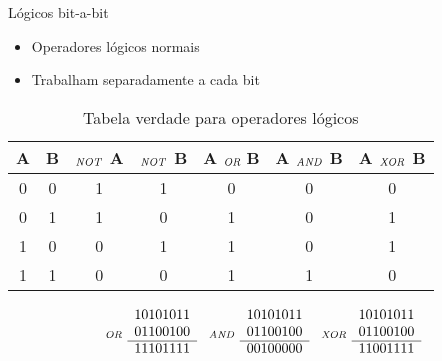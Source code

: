 \documentclass[11pt]{beamer}
\begin{document}
	\begin{frame}{Lógicos bit-a-bit}
		\only<1>
		{
			\begin{itemize}
				\presentationPause\item Operadores lógicos normais
				\presentationPause\item Trabalham separadamente a cada bit
			\end{itemize}
			\presentationPause
			\presentationPause\begin{table}[!h]
				\centering
				\caption{Tabela verdade para operadores lógicos}
				\label{table.truth}
				\begin{tabular}{c|c||c|c|c|c|c}
					A & B & $_\text{\emph{NOT}}$ A & $_\text{\emph{NOT}}$ B & A $_\text{\emph{OR} }$B & A $_\text{\emph{AND}}$ B & A $_\text{\emph{XOR}}$ B \\\hline
					0 & 0 & 1 & 1 & 0 & 0 & 0 \\
					0 & 1 & 1 & 0 & 1 & 0 & 1 \\
					1 & 0 & 0 & 1 & 1 & 0 & 1 \\
					1 & 1 & 0 & 0 & 1 & 1 & 0 \\
				\end{tabular}
			\end{table}
		}
		{
			\presentationPause
			\presentationPause\begin{equation}\nonumber
				\begin{array}{cc}
					&	10101011\\
					_\text{\emph{OR}}\!	&	01100100\\\cline{2-2}
					&	11101111
				\end{array}\  
				\begin{array}{cc}
					&	10101011\\
					_\text{\emph{AND}}\!	&	01100100\\\cline{2-2}
					&	00100000
				\end{array}\
				\begin{array}{cc}
					&	10101011\\
					_\text{\emph{XOR}}\! &	01100100\\\cline{2-2}
					&	11001111
				\end{array}
			\end{equation}
		}		
	\end{frame}
\end{document}
